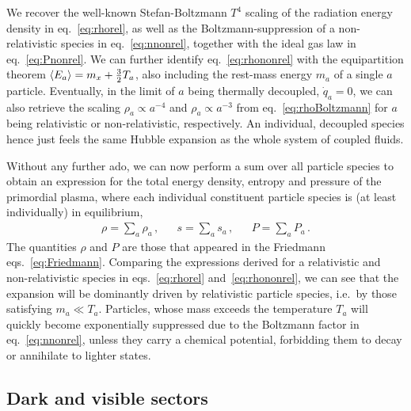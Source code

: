 We recover the well-known Stefan-Boltzmann $T^4$ scaling of the radiation energy density in eq.~\eqref{eq:rhorel}, as well as the Boltzmann-suppression of a non-relativistic species in eq.~\eqref{eq:nnonrel}, together with the ideal gas law in eq.~\eqref{eq:Pnonrel}. We can further identify eq.~\eqref{eq:rhononrel} with the equipartition theorem $\langle E_a \rangle = m_x + \frac{3}{2} T_a$, also including the rest-mass energy $m_a$ of a single $a$ particle. Eventually, in the limit of $a$ being thermally decoupled, $\dot{q}_a = 0$, we can also retrieve the scaling $\rho_a \propto a^{-4}$  and $\rho_a \propto a^{-3}$ from eq.~\eqref{eq:rhoBoltzmann} for $a$ being relativistic or non-relativistic, respectively. An individual, decoupled species hence just feels the same Hubble expansion as the whole system of coupled fluids.

Without any further ado, we can now perform a sum over all particle species to obtain an expression for the total energy density, entropy and pressure of the primordial plasma, where each individual constituent particle species is (at least individually) in equilibrium,
\begin{align}
	\rho = \sum_a \rho_a \, , && s = \sum_a s_a \, ,&& P = \sum_a P_a \, .
\end{align}
The quantities $\rho$ and $P$ are those that appeared in the Friedmann eqs.~\eqref{eq:Friedmann}. Comparing the expressions derived for a relativistic and non-relativistic species in eqs.~\eqref{eq:rhorel} and~\eqref{eq:rhononrel}, we can see that the expansion will be dominantly driven by relativistic particle species, i.e.~by those satisfying $m_a \ll T_a$. Particles, whose mass exceeds the temperature $T_a$ will quickly become exponentially suppressed due to the Boltzmann factor in eq.~\eqref{eq:nnonrel}, unless they carry a chemical potential, forbidding them to decay or annihilate to lighter states.

\subsection{Dark and visible sectors} \label{sec:sectors}


